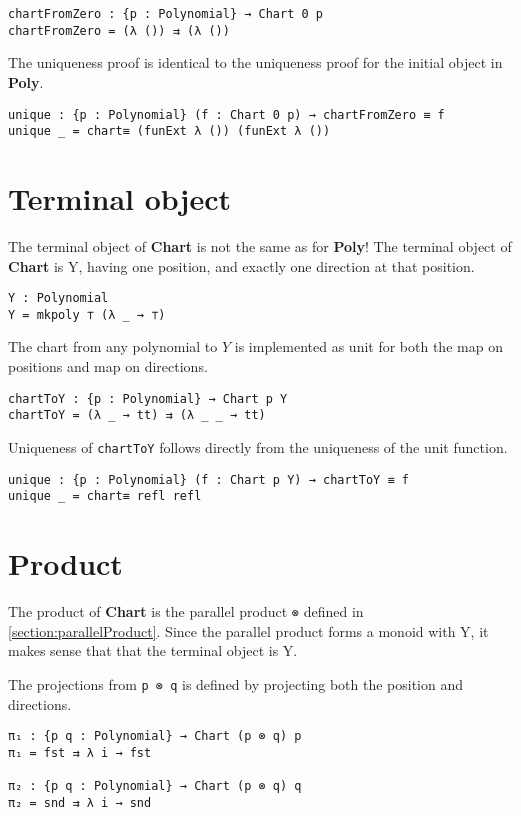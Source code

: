 \begin{verbatim}
chartFromZero : {p : Polynomial} → Chart 0 p
chartFromZero = (λ ()) ⇉ (λ ())
\end{verbatim}

The uniqueness proof is identical to the uniqueness proof for the initial object in \textbf{Poly}.

\begin{verbatim}
unique : {p : Polynomial} (f : Chart 0 p) → chartFromZero ≡ f
unique _ = chart≡ (funExt λ ()) (funExt λ ())
\end{verbatim}

\section{Terminal object}
The terminal object of \textbf{Chart} is not the same as for \textbf{Poly}! The terminal object of \textbf{Chart} is Y, having one position, and exactly one direction at that position.

\begin{verbatim}
Y : Polynomial
Y = mkpoly ⊤ (λ _ → ⊤)
\end{verbatim}

The chart from any polynomial to $Y$ is implemented as unit for both the map on positions and map on directions. 

\begin{verbatim}
chartToY : {p : Polynomial} → Chart p Y
chartToY = (λ _ → tt) ⇉ (λ _ _ → tt)
\end{verbatim}

Uniqueness of \texttt{chartToY} follows directly from the uniqueness of the unit function.

\begin{verbatim}
unique : {p : Polynomial} (f : Chart p Y) → chartToY ≡ f
unique _ = chart≡ refl refl
\end{verbatim}


\section{Product}
The product of \textbf{Chart} is the parallel product \texttt{⊗} defined in \ref{section:parallelProduct}. Since the parallel product forms a monoid with Y, it makes sense that that the terminal object is Y.

The projections from \texttt{p ⊗ q} is defined by projecting both the position and directions.

\begin{verbatim}
π₁ : {p q : Polynomial} → Chart (p ⊗ q) p
π₁ = fst ⇉ λ i → fst

π₂ : {p q : Polynomial} → Chart (p ⊗ q) q
π₂ = snd ⇉ λ i → snd
\end{verbatim}

